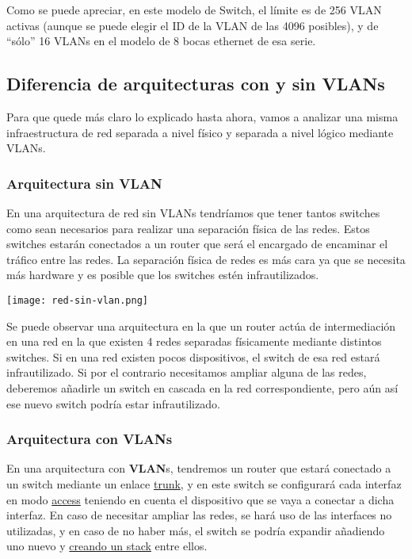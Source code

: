 Como se puede apreciar, en este modelo de Switch, el límite es de 256 VLAN activas (aunque se puede elegir el ID de la VLAN de las 4096 posibles), y de “sólo” 16 VLANs en el modelo de 8 bocas ethernet de esa serie.


\subsection{Diferencia de arquitecturas con y sin VLANs}
Para que quede más claro lo explicado hasta ahora, vamos a analizar una misma infraestructura de red separada a nivel físico y separada a nivel lógico mediante VLANs.

\subsubsection{Arquitectura sin VLAN}
En una arquitectura de red sin VLANs tendríamos que tener tantos switches como sean necesarios para realizar una separación física de las redes. Estos switches estarán conectados a un router que será el encargado de encaminar el tráfico entre las redes. La separación física de redes es más cara ya que se necesita más hardware y es posible que los switches estén infrautilizados.

\begin{center}
    \vspace{-15pt}
    \texttt{[image: red-sin-vlan.png]}
    \vspace{-15pt}
\end{center}

Se puede observar una arquitectura en la que un router actúa de intermediación en una red en la que existen 4 redes separadas físicamente mediante distintos switches. Si en una red existen pocos dispositivos, el switch de esa red estará infrautilizado. Si por el contrario necesitamos ampliar alguna de las redes, deberemos añadirle un switch en cascada en la red correspondiente, pero aún así ese nuevo switch podría estar infrautilizado.


\subsubsection{Arquitectura con VLANs}

En una arquitectura con \textbf{VLAN}s, tendremos un router que estará conectado a un switch mediante un enlace \hyperlink{puerto_trunk}{trunk}, y en este switch se configurará cada interfaz en modo \hyperlink{puerto_access}{access} teniendo en cuenta el dispositivo que se vaya a conectar a dicha interfaz. En caso de necesitar ampliar las redes, se hará uso de las interfaces no utilizadas, y en caso de no haber más, el switch se podría expandir añadiendo uno nuevo y \hyperlink{stack_switches}{creando un stack} entre ellos.

